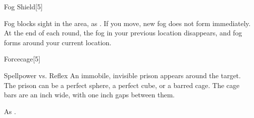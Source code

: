 \begin{spellsection}{Fog Shield}[5]
    \begin{spellheader}
    \end{spellheader}
    \begin{spellcontent}
        \begin{spelltargetinginfo}
        \end{spelltargetinginfo}
        \begin{spelleffects}
            \spelleffect Fog blocks sight in the area, as . If you move, new fog does not form immediately. At the end of each round, the fog in your previous location disappears, and fog forms around your current location.
            \spelldur \durshort
        \end{spelleffects}
    \end{spellcontent}
    \begin{spellfooter}
        \spellnotes \fogspellnotes \fogwindspellnotes
        \miscastexplode
    \end{spellfooter}
\end{spellsection}

\begin{spellsection}{Forcecage}[5]
    \begin{spellheader}
    \end{spellheader}
    \begin{spellcontent}
        \begin{spelltargetinginfo}
        \end{spelltargetinginfo}
        \begin{spelleffects}
            \begin{spellattack}{Spellpower vs. Reflex}
                \spellsuccess An immobile, invisible prison appears around the target. The prison can be a perfect sphere, a perfect cube, or a barred cage. The cage bars are an inch wide, with one inch gaps between them.
            \end{spellattack}
            \spelldur \durshort \dismissable
        \end{spelleffects}
    \end{spellcontent}
    \begin{spellfooter}
        \spellnotes As .
        \miscastrandom
    \end{spellfooter}
\end{spellsection}

